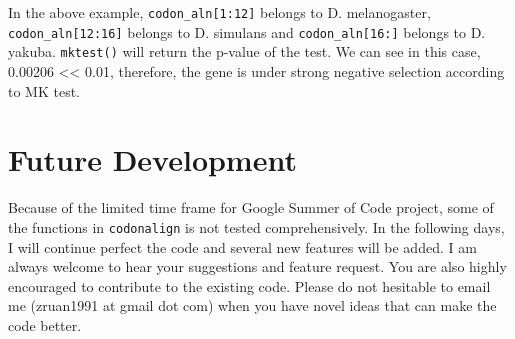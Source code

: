 In the above example, \texttt{codon\_aln{[}1:12{]}} belongs to
D. melanogaster, \texttt{codon\_aln{[}12:16{]}} belongs to D. simulans
and \texttt{codon\_aln{[}16:{]}} belongs to D. yakuba. \verb|mktest()|
will return the p-value of the test. We can see in this case, 0.00206
\textless{}\textless{} 0.01, therefore, the gene is under strong
negative selection according to MK test.

\section{Future Development}

Because of the limited time frame for Google Summer of Code project,
some of the functions in \verb|codonalign| is not tested
comprehensively. In the following days, I will continue perfect the code
and several new features will be added. I am always welcome to hear your
suggestions and feature request. You are also highly encouraged to
contribute to the existing code. Please do not hesitable to email me
(zruan1991 at gmail dot com) when you have novel ideas that can make the
code better.

